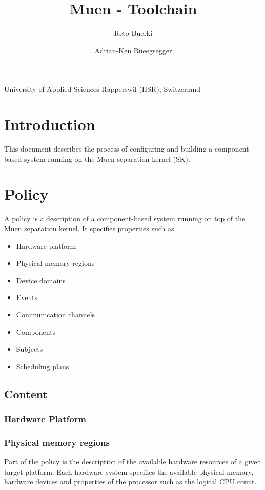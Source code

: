 \documentclass[a4paper,twoside,titlepage]{article}
\title{Muen - Toolchain}
\author{Reto Buerki \and Adrian-Ken Rueegsegger}
\begin{document}


\maketitle

\begin{center}
	University of Applied Sciences Rapperswil (HSR), Switzerland
\end{center}
\clearpage

\tableofcontents
\listoffigures
\lstlistoflistings

\section{Introduction}
This document describes the process of configuring and building a
component-based system running on the Muen separation kernel (SK).

\section{Policy}
A policy is a description of a component-based system running on top of the Muen
separation kernel. It specifies properties such as

\begin{itemize}
	\item Hardware platform
	\item Physical memory regions
	\item Device domains
	\item Events
	\item Communication channels
	\item Components
	\item Subjects
	\item Scheduling plans
\end{itemize}

\subsection{Content}
\subsubsection{Hardware Platform}

\subsubsection{Physical memory regions}
Part of the policy is the description of the available hardware resources of a
given target platform. Each hardware system specifies the available physical
memory, hardware devices and properties of the processor such as the logical
CPU count.
\end{document}
